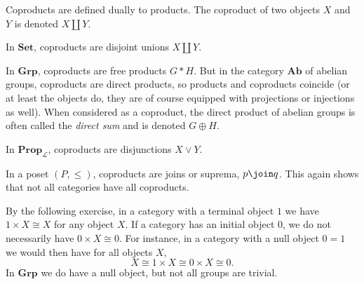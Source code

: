 \documentclass[article, a4paper, 11pt, oneside]{memoir}
\numberwithin{equation}{chapter}
\newcommand{\calL}{\mathcal{L}}
\newcommand{\ncat}[1]{\mathbf{#1}} %
\newcommand{\catSet}{\ncat{Set}}
\newcommand{\catGrp}{\ncat{Grp}}
\newcommand{\catAb}{\ncat{Ab}}
\newcommand{\catProp}{\ncat{Prop}}
\renewcommand{\coprod}{\amalg}
\newcommand{\freeprod}{*} %
\newcommand{\dirsum}{\oplus}
\begin{document}
\begin{example}
    Coproducts are defined dually to products. The coproduct of two objects $X$ and $Y$ is denoted $X \coprod Y$.
    \begin{enumexample}
        \item In $\catSet$, coproducts are disjoint unions $X \coprod Y$.
        
        \item In $\catGrp$, coproducts are free products $G \freeprod H$. But in the category $\catAb$ of abelian groups, coproducts are direct products, so products and coproducts coincide (or at least the objects do, they are of course equipped with projections or injections as well). When considered as a coproduct, the direct product of abelian groups is often called the \emph{direct sum} and is denoted $G \dirsum H$.
        
        \item In $\catProp_\calL$, coproducts are disjunctions $X \lor Y$.
        
        \item In a poset $(P, \leq)$, coproducts are joins or suprema, $p \join q$. This again shows that not all categories have all coproducts.
    \end{enumexample}
\end{example}


\begin{remark}
    By the following exercise, in a category with a terminal object $1$ we have $1 \times X \cong X$ for any object $X$. If a category has an initial object $0$, we do not necessarily have $0 \times X \cong 0$. For instance, in a category with a null object $0 = 1$ we would then have for all objects $X$,
    \begin{equation*}
        X
            \cong 1 \times X
            \cong 0 \times X
            \cong 0.
    \end{equation*}
    In $\catGrp$ we do have a null object, but not all groups are trivial.
\end{remark}



\end{document}
